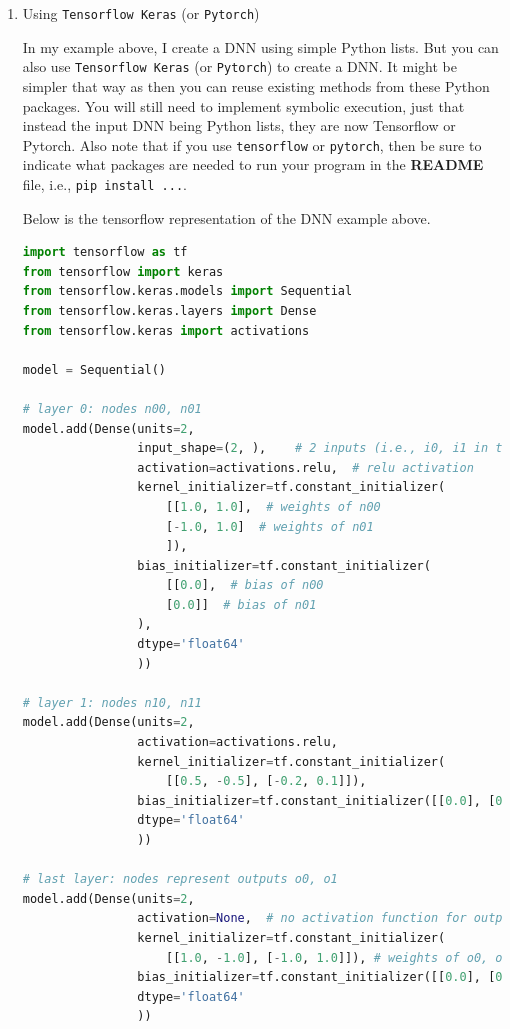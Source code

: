 \documentclass[oneside,11pt,dvipsnames]{book}
\numberwithin{equation}{section}
\theoremstyle{definition}
\theoremstyle{remark}
\begin{document}
\begin{enumerate}[label=\arabic*.]
\item Using \texttt{Tensorflow Keras} (or \texttt{Pytorch})

In my example above, I create a DNN using simple Python lists.  But you can also use \texttt{Tensorflow Keras} (or \texttt{Pytorch}) to create a DNN.  It might be simpler that way as then you can reuse existing methods from these Python packages.  You will still need to implement symbolic execution, just that instead the input DNN being Python lists, they are now Tensorflow or Pytorch.  Also note that if you use \texttt{tensorflow} or \texttt{pytorch}, then be sure to indicate what packages are needed to run your program in the \textbf{README} file, i.e., \texttt{pip install ...}.

Below is the tensorflow representation of the DNN example above. 

\begin{lstlisting}[language=Python]
import tensorflow as tf
from tensorflow import keras
from tensorflow.keras.models import Sequential
from tensorflow.keras.layers import Dense
from tensorflow.keras import activations

model = Sequential()

# layer 0: nodes n00, n01
model.add(Dense(units=2,
                input_shape=(2, ),    # 2 inputs (i.e., i0, i1 in the Figure)
                activation=activations.relu,  # relu activation
                kernel_initializer=tf.constant_initializer(
                    [[1.0, 1.0],  # weights of n00
                    [-1.0, 1.0]  # weights of n01
                    ]),
                bias_initializer=tf.constant_initializer(
                    [[0.0],  # bias of n00
                    [0.0]]  # bias of n01
                ), 
                dtype='float64'
                ))

# layer 1: nodes n10, n11
model.add(Dense(units=2,
                activation=activations.relu,
                kernel_initializer=tf.constant_initializer(
                    [[0.5, -0.5], [-0.2, 0.1]]),
                bias_initializer=tf.constant_initializer([[0.0], [0.0]]),
                dtype='float64'
                ))

# last layer: nodes represent outputs o0, o1
model.add(Dense(units=2,
                activation=None,  # no activation function for output nodes
                kernel_initializer=tf.constant_initializer(
                    [[1.0, -1.0], [-1.0, 1.0]]), # weights of o0, o1
                bias_initializer=tf.constant_initializer([[0.0], [0.0]]),  # bias of o0, o1
                dtype='float64'
                ))
\end{lstlisting}
\end{enumerate}
\end{document}
